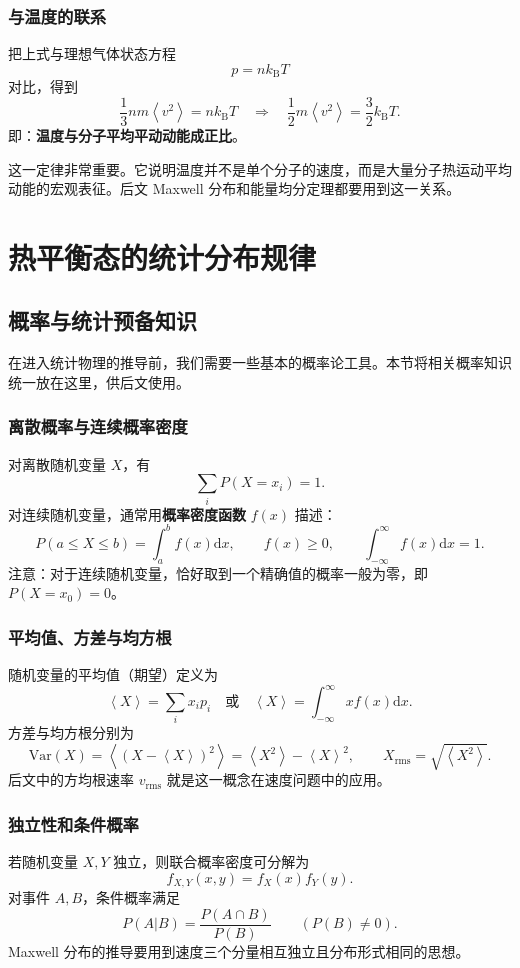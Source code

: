 \documentclass[11pt,a4paper,openany]{ctexbook}
\newcommand{\dd}{\mathrm d}
\newcommand{\kb}{k_{\mathrm B}}
\newcommand{\avg}[1]{\left\langle #1\right\rangle}
\begin{document}
\subsection*{与温度的联系}
把上式与理想气体状态方程
\[
p=n\kb T
\]
对比，得到
\[
\frac13nm\avg{v^2}=n\kb T
\quad\Longrightarrow\quad
\boxed{\frac12m\avg{v^2}=\frac32\kb T}.
\]
即：\textbf{温度与分子平均平动动能成正比}。

\begin{notebox}
这一定律非常重要。它说明温度并不是单个分子的速度，而是大量分子热运动平均动能的宏观表征。后文 Maxwell 分布和能量均分定理都要用到这一关系。
\end{notebox}

\chapter{热平衡态的统计分布规律}

\section{概率与统计预备知识}
在进入统计物理的推导前，我们需要一些基本的概率论工具。本节将相关概率知识统一放在这里，供后文使用。

\subsection*{离散概率与连续概率密度}
对离散随机变量 $X$，有
\[
\sum_i P(X=x_i)=1.
\]
对连续随机变量，通常用\textbf{概率密度函数} $f(x)$ 描述：
\[
P(a\le X\le b)=\int_a^b f(x)\dd x,\qquad
f(x)\ge0,\qquad
\int_{-\infty}^{\infty}f(x)\dd x=1.
\]
注意：对于连续随机变量，恰好取到一个精确值的概率一般为零，即 $P(X=x_0)=0$。

\subsection*{平均值、方差与均方根}
随机变量的平均值（期望）定义为
\[
\avg X=\sum_i x_i p_i
\quad \text{或}\quad
\avg X=\int_{-\infty}^\infty x f(x)\dd x.
\]
方差与均方根分别为
\[
\mathrm{Var}(X)=\avg{(X-\avg X)^2}
=\avg{X^2}-\avg X^2,
\qquad
X_{\mathrm{rms}}=\sqrt{\avg{X^2}}.
\]
后文中的方均根速率 $v_{\mathrm{rms}}$ 就是这一概念在速度问题中的应用。

\subsection*{独立性和条件概率}
若随机变量 $X,Y$ 独立，则联合概率密度可分解为
\[
f_{X,Y}(x,y)=f_X(x)f_Y(y).
\]
对事件 $A,B$，条件概率满足
\[
P(A|B)=\frac{P(A\cap B)}{P(B)}\qquad (P(B)\neq0).
\]
Maxwell 分布的推导要用到速度三个分量相互独立且分布形式相同的思想。
\end{document}
